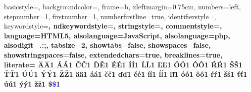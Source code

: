  {%
  basicstyle={\footnotesize\ttfamily},   
  backgroundcolor=\color{lightgray},
  frame=b,
  xleftmargin={0.75cm},
  numbers=left,
  stepnumber=1,
  firstnumber=1,
  numberfirstline=true,	
  identifierstyle=\color{black},
  keywordstyle=\color{blue}\bfseries,
  ndkeywordstyle=\color{brown}\bfseries,
  stringstyle=\color{editorGreen}\ttfamily,
  commentstyle=\color{darkgray}\ttfamily,
  language=HTML5,
  alsolanguage=JavaScript,
  alsolanguage=php,
  alsodigit={.:;},	
  tabsize=2,
  showtabs=false,
  showspaces=false,
  showstringspaces=false,
  extendedchars=true,
  breaklines=true,
  literate=%
  {Ä}{{\"A}}1
  {Á}{{\'A}}1
  {Č}{{\v{C}}}1
  {Ď}{{\v{E}}}1
  {É}{{\'E}}1
  {Í}{{\'I}}1
  {Ĺ}{{\'L}}1
  {Ľ}{{\v{L}}}1
  {Ó}{{\'O}}1
  {Ô}{{\^{O}}}1
  {Ŕ}{{\'R}}1
  {Š}{{\v{S}}}1
  {Ť}{{\v{T}}}1
  {Ú}{{\'U}}1
  {Ý}{{\'Y}}1
  {Ž}{{\v{Z}}}1
  {ä}{{\"a}}1
  {á}{{\'a}}1
  {č}{{\v{c}}}1
  {ď}{{\v{d}}}1
  {é}{{\'e}}1
  {í}{{\'i}}1
  {ĺ}{{\'l}}1
  {ľ}{{\v{l}}}1
  {ó}{{\'o}}1
  {ô}{{\^{o}}}1
  {ŕ}{{\'r}}1
  {š}{{\v{s}}}1
  {ť}{{\v{t}}}1
  {ú}{{\'u}}1
  {ý}{{\'y}}1
  {ž}{{\v{z}}}1
  {\$}{{\textcolor{blue}{\$}}}1
}

\newcommand\code[1]{\colorbox{lightgray}{\lstinline[style=web,mathescape]`#1`}}

